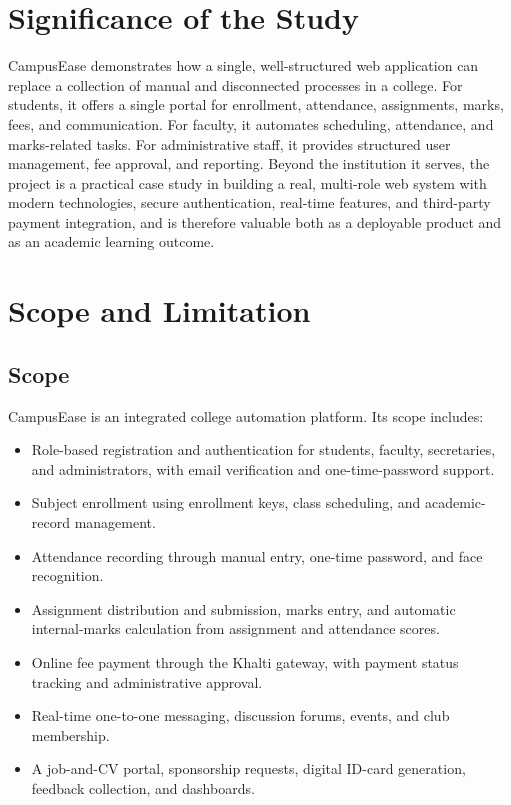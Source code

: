 \documentclass[12pt,a4paper]{report}
\begin{document}
\section{Significance of the Study}

CampusEase demonstrates how a single, well-structured web application can replace a collection of manual and disconnected processes in a college. For students, it offers a single portal for enrollment, attendance, assignments, marks, fees, and communication. For faculty, it automates scheduling, attendance, and marks-related tasks. For administrative staff, it provides structured user management, fee approval, and reporting. Beyond the institution it serves, the project is a practical case study in building a real, multi-role web system with modern technologies, secure authentication, real-time features, and third-party payment integration, and is therefore valuable both as a deployable product and as an academic learning outcome.

\section{Scope and Limitation}

\subsection{Scope}

CampusEase is an integrated college automation platform. Its scope includes:

\begin{itemize}
    \item Role-based registration and authentication for students, faculty, secretaries, and administrators, with email verification and one-time-password support.
    \item Subject enrollment using enrollment keys, class scheduling, and academic-record management.
    \item Attendance recording through manual entry, one-time password, and face recognition.
    \item Assignment distribution and submission, marks entry, and automatic internal-marks calculation from assignment and attendance scores.
    \item Online fee payment through the Khalti gateway, with payment status tracking and administrative approval.
    \item Real-time one-to-one messaging, discussion forums, events, and club membership.
    \item A job-and-CV portal, sponsorship requests, digital ID-card generation, feedback collection, and dashboards.
\end{itemize}
\end{document}
